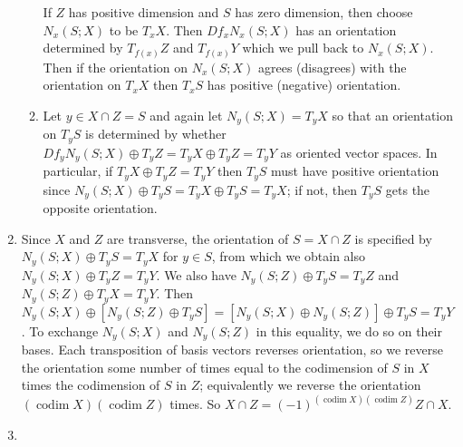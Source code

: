 \documentclass[11pt,leqno]{article}
\theoremstyle{plain}
\theoremstyle{definition}
\numberwithin{equation}{section}
\numberwithin{lem}{section}
\DeclareMathOperator{\codim}{codim}
\begin{document}
\begin{enumerate}
\begin{enumerate}
        If $Z$ has positive dimension and $S$ has zero dimension, then choose $N_x(S;X)$ to be $T_xX$. Then $Df_xN_x(S;X)$ has an orientation determined by $T_{f(x)}Z$ and $T_{f(x)}Y$ which we pull back to $N_x(S;X)$. Then if the orientation on $N_x(S;X)$ agrees (disagrees) with the orientation on $T_xX$ then $T_xS$ has positive (negative) orientation.
        \item Let $y\in X\cap Z = S$ and again let $N_y(S;X) = T_yX$ so that an orientation on $T_yS$ is determined by whether $Df_yN_y(S;X) \oplus T_yZ = T_yX \oplus T_yZ = T_yY$ as oriented vector spaces. In particular, if $T_yX \oplus T_yZ = T_yY$ then $T_yS$ must have positive orientation since $N_y(S;X) \oplus T_yS = T_yX \oplus T_yS = T_yX$; if not, then $T_yS$ gets the opposite orientation.
    \end{enumerate}
    \item Since $X$ and $Z$ are transverse, the orientation of $S = X\cap Z$ is specified by $N_y(S;X) \oplus T_yS = T_yX$ for $y\in S$, from which we obtain also $N_y(S;X)\oplus T_yZ = T_yY$. We also have $N_y(S;Z)\oplus T_yS = T_yZ$ and $N_y(S;Z)\oplus T_yX = T_yY$. Then $N_y(S;X)\oplus [N_y(S;Z)\oplus T_yS] = [N_y(S;X)\oplus  N_y(S;Z)] \oplus T_yS = T_yY$. To exchange $N_y(S;X)$ and $N_y(S;Z)$ in this equality, we do so on their bases. Each transposition of basis vectors reverses orientation, so we reverse the orientation some number of times equal to the codimension of $S$ in $X$ times the codimension of $S$ in $Z$; equivalently we reverse the orientation $(\codim X) (\codim Z)$ times. So $X\cap Z = (-1)^{(\codim X)(\codim Z)}Z\cap X$.
    \item 
\end{enumerate}
\end{document}
